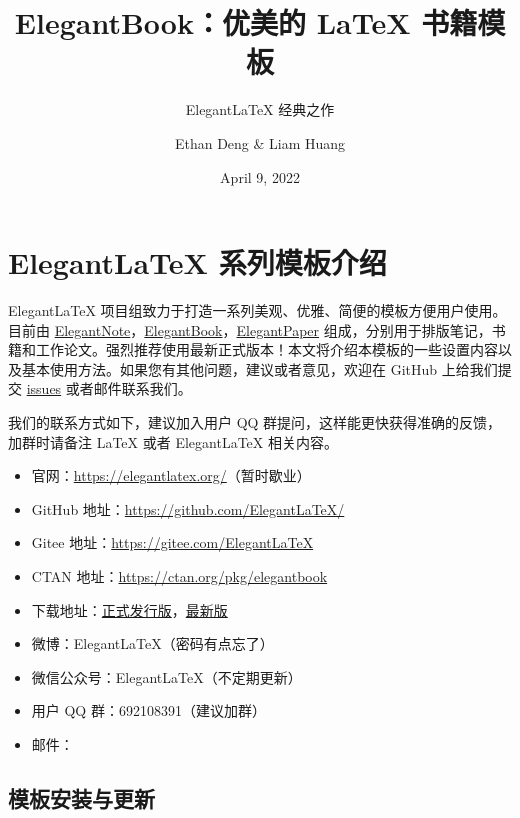 \documentclass[lang=cn,10pt]{elegantbook}
\title{ElegantBook：优美的 \LaTeX{} 书籍模板}
\subtitle{Elegant\LaTeX{} 经典之作}
\author{Ethan Deng \& Liam Huang}
\institute{Elegant\LaTeX{} Program}
\date{April 9, 2022}
\begin{document}
\maketitle
\frontmatter

\tableofcontents

\mainmatter

\chapter{Elegant\LaTeX{} 系列模板介绍}

Elegant\LaTeX{} 项目组致力于打造一系列美观、优雅、简便的模板方便用户使用。目前由 \href{https://github.com/ElegantLaTeX/ElegantNote}{ElegantNote}，\href{https://github.com/ElegantLaTeX/ElegantBook}{ElegantBook}，\href{https://github.com/ElegantLaTeX/ElegantPaper}{ElegantPaper} 组成，分别用于排版笔记，书籍和工作论文。强烈推荐使用最新正式版本！本文将介绍本模板的一些设置内容以及基本使用方法。如果您有其他问题，建议或者意见，欢迎在 GitHub 上给我们提交 \href{https://github.com/ElegantLaTeX/ElegantBook/issues}{issues} 或者邮件联系我们。

我们的联系方式如下，建议加入用户 QQ 群提问，这样能更快获得准确的反馈，加群时请备注 \LaTeX{} 或者 Elegant\LaTeX{} 相关内容。
\begin{itemize}
  \item 官网：\href{https://elegantlatex.org/}{https://elegantlatex.org/}（暂时歇业）
  \item GitHub 地址：\href{https://github.com/ElegantLaTeX/}{https://github.com/ElegantLaTeX/}
  \item Gitee 地址：\href{https://gitee.com/ElegantLaTeX}{https://gitee.com/ElegantLaTeX}
  \item CTAN 地址：\href{https://ctan.org/pkg/elegantbook}{https://ctan.org/pkg/elegantbook}
  \item 下载地址：\href{https://github.com/ElegantLaTeX/ElegantBook/releases}{正式发行版}，\href{https://github.com/ElegantLaTeX/ElegantBook/archive/master.zip}{最新版}
  \item 微博：Elegant\LaTeX{}（密码有点忘了）
  \item 微信公众号：Elegant\LaTeX{}（不定期更新）
  \item 用户 QQ 群：692108391（建议加群）
  \item 邮件：
\end{itemize}

\section{模板安装与更新}
\end{document}
